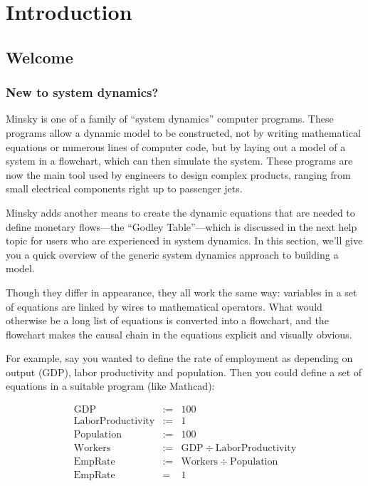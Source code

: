 \chapter{Introduction}
\label{Introduction}

\section{Welcome}

\subsection{New to system dynamics?}
\label{intro:new}

Minsky is one of a family of ``system dynamics'' computer
programs. These programs allow a dynamic model to be constructed, not
by writing mathematical equations or numerous lines of computer code,
but by laying out a model of a system in a flowchart, which can then
simulate the system. These programs are now the main tool used by
engineers to design complex products, ranging from small electrical
components right up to passenger jets.


Minsky adds another means to create the dynamic equations that are
needed to define monetary flows---the ``Godley Table''---which is
discussed in the next help topic for users who are experienced in
system dynamics. In this section, we'll give you a quick overview of
the generic system dynamics approach to building a model.


Though they differ in appearance, they all work the same way:
variables in a set of equations are linked by wires to mathematical
operators. What would otherwise be a long list of equations is
converted into a flowchart, and the flowchart makes the causal chain
in the equations explicit and visually obvious.

For example, say you wanted to define the rate of employment as
depending on output (GDP), labor productivity and population. Then you
could define a set of equations in a suitable program (like Mathcad):

\begin{eqnarray*}
\mathrm{GDP}&:=&100\\
\mathrm{LaborProductivity}&:=&1\\
\mathrm{Population}&:=&100\\
\mathrm{Workers}&:=&\mathrm{GDP}\div\mathrm{LaborProductivity}\\
\mathrm{EmpRate}&:=&\mathrm{Workers}\div\mathrm{Population}\\
\mathrm{EmpRate}&=&1
\end{eqnarray*}

